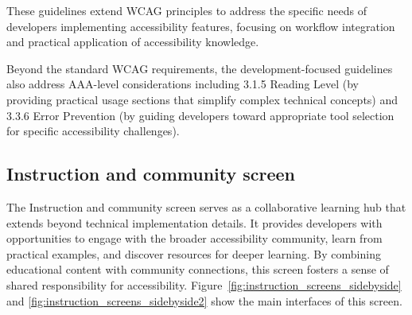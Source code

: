 These guidelines extend WCAG principles to address the specific needs of developers implementing accessibility features, focusing on workflow integration and practical application of accessibility knowledge.

Beyond the standard WCAG requirements, the development-focused guidelines also address AAA-level considerations including 3.1.5 Reading Level (by providing practical usage sections that simplify complex technical concepts) and 3.3.6 Error Prevention (by guiding developers toward appropriate tool selection for specific accessibility challenges).

\subsection{Instruction and community screen}
\label{subsec:instruction-community-screen}

The Instruction and community screen serves as a collaborative learning hub that extends beyond technical implementation details. It provides developers with opportunities to engage with the broader accessibility community, learn from practical examples, and discover resources for deeper learning. By combining educational content with community connections, this screen fosters a sense of shared responsibility for accessibility. Figure~\ref{fig:instruction_screens_sidebyside} and \ref{fig:instruction_screens_sidebyside2} show the main interfaces of this screen.

